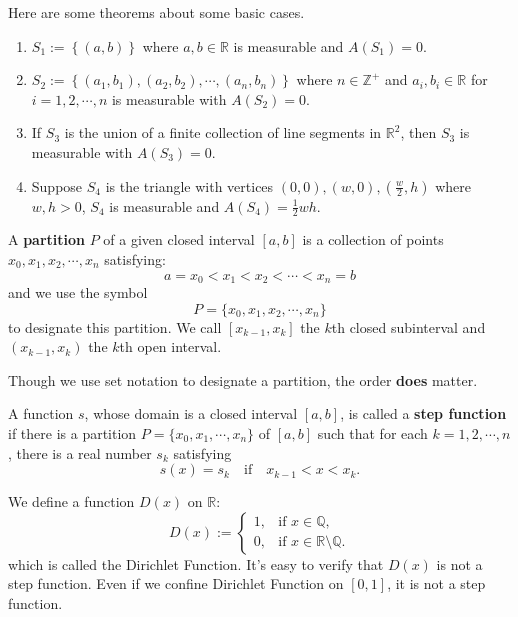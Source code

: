 \documentclass[a4paper]{ctexart}
\begin{document}
	\begin{mythm} Here are some theorems about some basic cases.
		\begin{enumerate}
			\item $S_1:=\left\{ (a,b)\right\} $ where $a,b\in \mathbb{R}$ is measurable and $A(S_1)=0$.
			\item $S_2:=\left\{ (a_1,b_1),(a_2,b_2),\cdots,(a_n,b_n)\right\}$ where $n\in \mathbb{Z}^+$ and $a_i,b_i\in \mathbb{R}$ for $i=1,2,\cdots, n$ is measurable with $A(S_2)=0$.
			\item If $S_3$ is the union of a finite collection of line segments in $\mathbb{R}^2$, then $S_3$ is measurable with $A(S_3)=0$.
			\item Suppose $S_4$ is the triangle with vertices $(0,0),(w,0),(\frac{w}{2},h)$ where $w,h>0$, $S_4$ is measurable and $A(S_4)=\frac{1}{2}wh$.
		\end{enumerate}
	\end{mythm}
	\begin{mydef}
		A \textbf{partition} $P$ of a given closed interval $[a,b]$ is a collection of points $x_0,x_1,x_2,\cdots,x_{n}$ satisfying:
		\[
		a=x_0<x_1<x_2<\cdots<x_n=b
		\]
		and we use the symbol
		\[
		P=\{x_0,x_1,x_2,\cdots,x_{n}\}
		\]
		to designate this partition. We call $[x_{k-1},x_k]$ the $k$th closed subinterval and $(x_{k-1},x_k)$ the $k$th open interval.
	\end{mydef}
	\begin{myrmk}
		Though we use set notation to designate a partition, the order \textbf{does} matter.
	\end{myrmk}
	\begin{mydef}
		A function $s$, whose domain is a closed interval $[a,b]$, is called a \textbf{step function} if there is a partition $P=\{x_0,x_1,\cdots,x_n\}$ of $[a,b]$ such that for each $k=1,2,\cdots,n$, there is a real number $s_k$ satisfying
		\[
		s(x)=s_k \quad \text{if} \quad x_{k-1}<x<x_k.
		\]
	\end{mydef}
	\begin{myex}
		We define a function $D(x)$ on $\mathbb{R}$:
		\[
		D(x):=
		\begin{cases}
			1, & \text{if } x \in \mathbb{Q}, \\[4pt]
			0, & \text{if } x \in \mathbb{R} \setminus \mathbb{Q}.
		\end{cases}
		\]
		which is called the Dirichlet Function. It's easy to verify that $D(x)$ is not a step function. Even if we confine Dirichlet Function on $[0,1]$, it is not a step function.
	\end{myex}
\end{document}
